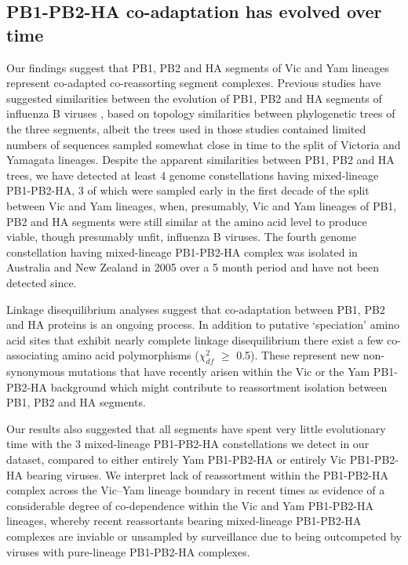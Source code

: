 \documentclass[11pt,oneside,letterpaper]{article}
\begin{document}
\subsection*{PB1-PB2-HA co-adaptation has evolved over time}
Our findings suggest that PB1, PB2 and HA segments of Vic and Yam lineages represent co-adapted co-reassorting segment complexes.
Previous studies have suggested similarities between the evolution of PB1, PB2 and HA segments of influenza B viruses \cite{hiromoto2000,lindstrom1999}, based on topology similarities between phylogenetic trees of the three segments, albeit the trees used in those studies contained limited numbers of sequences sampled somewhat close in time to the split of Victoria and Yamagata lineages.
Despite the apparent similarities between PB1, PB2 and HA trees, we have detected at least 4 genome constellations having mixed-lineage PB1-PB2-HA, 3 of which were sampled early in the first decade of the split between Vic and Yam lineages, when, presumably, Vic and Yam lineages of PB1, PB2 and HA segments were still similar at the amino acid level to produce viable, though presumably unfit, influenza B viruses.
The fourth genome constellation having mixed-lineage PB1-PB2-HA complex was isolated in Australia and New Zealand in 2005 over a 5 month period and have not been detected since.

Linkage disequilibrium analyses suggest that co-adaptation between PB1, PB2 and HA proteins is an ongoing process.
In addition to putative `speciation' amino acid sites that exhibit nearly complete linkage disequilibrium there exist a few co-associating amino acid polymorphisms ($\chi^{2}_{df}$ $\geq$ 0.5).
These represent new non-synonymous mutations that have recently arisen within the Vic or the Yam PB1-PB2-HA background which might contribute to reassortment isolation between PB1, PB2 and HA segments.


Our results also suggested that all segments have spent very little evolutionary time with the 3 mixed-lineage PB1-PB2-HA constellations we detect in our dataset, compared to either entirely Yam PB1-PB2-HA or entirely Vic PB1-PB2-HA bearing viruses.
We interpret lack of reassortment within the PB1-PB2-HA complex across the Vic--Yam lineage boundary in recent times as evidence of a considerable degree of co-dependence within the Vic and Yam PB1-PB2-HA lineages, whereby recent reassortants bearing mixed-lineage PB1-PB2-HA complexes are inviable or unsampled by surveillance due to being outcompeted by viruses with pure-lineage PB1-PB2-HA complexes.
\end{document}
